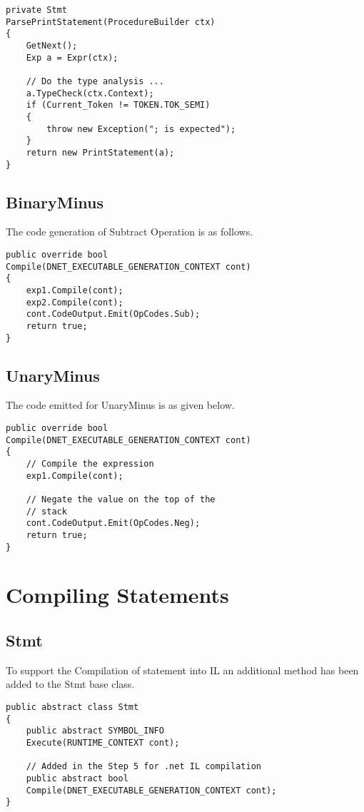 \lstset{style=csharp}
\begin{lstlisting}
private Stmt 
ParsePrintStatement(ProcedureBuilder ctx)
{
	GetNext();
	Exp a = Expr(ctx);
	
	// Do the type analysis ...
	a.TypeCheck(ctx.Context);
	if (Current_Token != TOKEN.TOK_SEMI)
	{
		throw new Exception("; is expected");
	}
	return new PrintStatement(a);
}
\end{lstlisting}

\subsection{BinaryMinus}
The code generation of Subtract Operation is as follows.

\lstset{style=csharp}
\begin{lstlisting}
public override bool 
Compile(DNET_EXECUTABLE_GENERATION_CONTEXT cont)
{
	exp1.Compile(cont);
	exp2.Compile(cont);
	cont.CodeOutput.Emit(OpCodes.Sub);
	return true;
}
\end{lstlisting}

\subsection{UnaryMinus}
The code emitted for UnaryMinus is as given below.

\lstset{style=csharp}
\begin{lstlisting}
public override bool 
Compile(DNET_EXECUTABLE_GENERATION_CONTEXT cont)
{
	// Compile the expression
	exp1.Compile(cont);
	
	// Negate the value on the top of the
	// stack
	cont.CodeOutput.Emit(OpCodes.Neg);
	return true;
}
\end{lstlisting}
\section{Compiling Statements}
\subsection{Stmt}
To support the Compilation of statement into IL an additional method has been added to the Stmt base class.
\lstset{style=csharp}
\begin{lstlisting}
public abstract class Stmt
{
	public abstract SYMBOL_INFO 
	Execute(RUNTIME_CONTEXT cont);

	// Added in the Step 5 for .net IL compilation
	public abstract bool 
	Compile(DNET_EXECUTABLE_GENERATION_CONTEXT cont);
}
\end{lstlisting}
